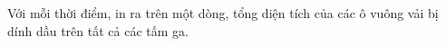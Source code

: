 Với mỗi thời điểm, in ra trên một dòng, tổng diện tích của các ô vuông vải bị dính dầu trên tất cả các tấm ga.  

\